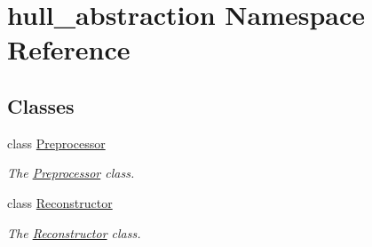 \hypertarget{namespacehull__abstraction}{}\section{hull\+\_\+abstraction Namespace Reference}
\label{namespacehull__abstraction}
\subsection*{Classes}
\begin{DoxyCompactItemize}
\item 
class \hyperlink{classhull__abstraction_1_1_preprocessor}{Preprocessor}
\begin{DoxyCompactList}\small\item\em The \hyperlink{classhull__abstraction_1_1_preprocessor}{Preprocessor} class. \end{DoxyCompactList}\item 
class \hyperlink{classhull__abstraction_1_1_reconstructor}{Reconstructor}
\begin{DoxyCompactList}\small\item\em The \hyperlink{classhull__abstraction_1_1_reconstructor}{Reconstructor} class. \end{DoxyCompactList}\end{DoxyCompactItemize}
